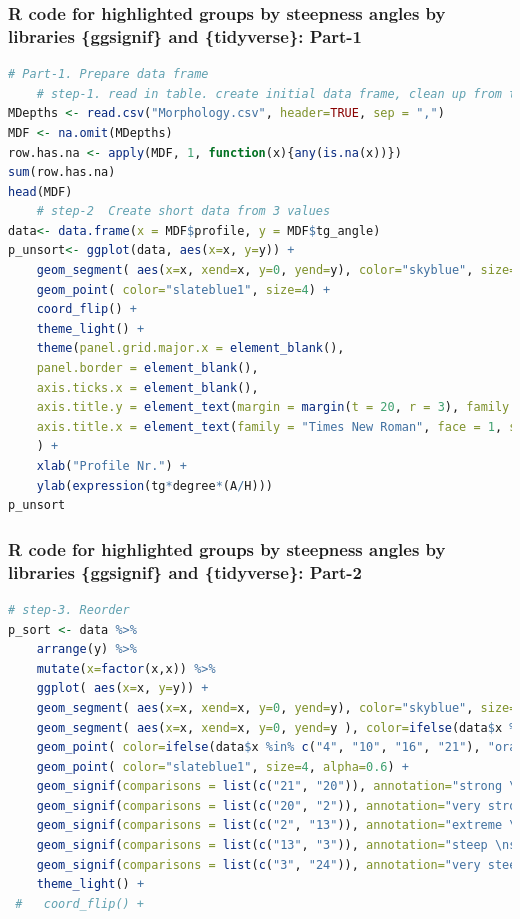 \documentclass[pdflatex,compress,10pt,
	xcolor={dvipsnames,dvipsnames,svgnames,x11names,table},
	hyperref={colorlinks = true,breaklinks = true, urlcolor = NavyBlue, breaklinks = true}]{beamer}
\begin{document}
\begin{frame}[fragile]\frametitle{R code for highlighted groups by steepness angles by libraries \{ggsignif\} and \{tidyverse\}: Part-1}
\begin{lstlisting}[language=R]
# Part-1. Prepare data frame 
	# step-1. read in table. create initial data frame, clean up from the NA
MDepths <- read.csv("Morphology.csv", header=TRUE, sep = ",")
MDF <- na.omit(MDepths) 
row.has.na <- apply(MDF, 1, function(x){any(is.na(x))}) 
sum(row.has.na) 
head(MDF)
	# step-2  Create short data from 3 values
data<- data.frame(x = MDF$profile, y = MDF$tg_angle)
p_unsort<- ggplot(data, aes(x=x, y=y)) +
	geom_segment( aes(x=x, xend=x, y=0, yend=y), color="skyblue", size=0.5) +
	geom_point( color="slateblue1", size=4) +
	coord_flip() +
	theme_light() +
	theme(panel.grid.major.x = element_blank(),
	panel.border = element_blank(),
	axis.ticks.x = element_blank(),
	axis.title.y = element_text(margin = margin(t = 20, r = 3), family = "Times New Roman", face = 1, size = 10),
	axis.title.x = element_text(family = "Times New Roman", face = 1, size = 10, margin = margin(t = .2)),
	) +
	xlab("Profile Nr.") +
	ylab(expression(tg*degree*(A/H)))
p_unsort
\end{lstlisting}		
\end{frame}

\begin{frame}[fragile]\frametitle{R code for highlighted groups by steepness angles by libraries \{ggsignif\} and \{tidyverse\}: Part-2}
\begin{lstlisting}[language=R]
	# step-3. Reorder
p_sort <- data %>%
	arrange(y) %>%
	mutate(x=factor(x,x)) %>%
	ggplot( aes(x=x, y=y)) +
	geom_segment( aes(x=x, xend=x, y=0, yend=y), color="skyblue", size=0.5) +
	geom_segment( aes(x=x, xend=x, y=0, yend=y ), color=ifelse(data$x %in% c("4", "10", "16", "21"), "orange", "skyblue"), size=ifelse(data$x %in% c("4", "10", "16", "21"), 1.3, 0.5) ) +
	geom_point( color=ifelse(data$x %in% c("4", "10", "16", "21"), "orange", "grey"), size=ifelse(data$x %in% c("4", "10", "16", "21"),  5,  2) ) +
	geom_point( color="slateblue1", size=4, alpha=0.6) +
	geom_signif(comparisons = list(c("21", "20")), annotation="strong \nslope", map_signif_level=TRUE, vjust = 1.3, textsize = 3.0, family = "Times New Roman") +
	geom_signif(comparisons = list(c("20", "2")), annotation="very strong \nslope", map_signif_level=TRUE, vjust = 1.3, textsize = 3.0, family = "Times New Roman") +
	geom_signif(comparisons = list(c("2", "13")), annotation="extreme \nslope", map_signif_level=TRUE, vjust = 1.3, textsize = 3.0, family = "Times New Roman") +
	geom_signif(comparisons = list(c("13", "3")), annotation="steep \nslope", map_signif_level=TRUE, vjust = 1.3, textsize = 3.0, family = "Times New Roman") +
	geom_signif(comparisons = list(c("3", "24")), annotation="very steep \nslope", map_signif_level=TRUE, vjust = 0.5, textsize = 3.0, family = "Times New Roman") +
	theme_light() +
 #   coord_flip() +
\end{lstlisting}		
\end{frame}
\end{document}
